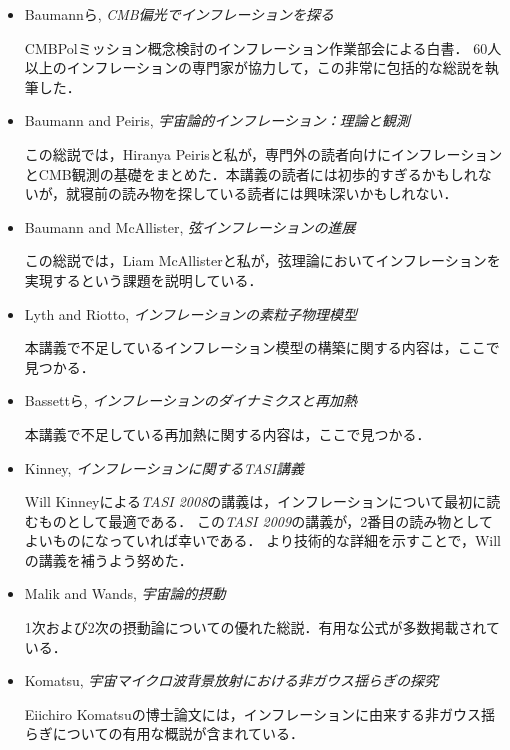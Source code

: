 \begin{itemize}
\item Baumannら, {\it CMB偏光でインフレーションを探る}

CMBPolミッション概念検討のインフレーション作業部会による白書．
60人以上のインフレーションの専門家が協力して，この非常に包括的な総説を執筆した．

\item Baumann and Peiris, {\it 宇宙論的インフレーション：理論と観測}

この総説では，Hiranya Peirisと私が，専門外の読者向けにインフレーションとCMB観測の基礎をまとめた．本講義の読者には初歩的すぎるかもしれないが，就寝前の読み物を探している読者には興味深いかもしれない．

\item Baumann and McAllister, {\it 弦インフレーションの進展}

この総説では，Liam McAllisterと私が，弦理論においてインフレーションを実現するという課題を説明している．

\item Lyth and Riotto, {\it インフレーションの素粒子物理模型}

本講義で不足しているインフレーション模型の構築に関する内容は，ここで見つかる．

\item Bassettら, {\it インフレーションのダイナミクスと再加熱}

本講義で不足している再加熱に関する内容は，ここで見つかる．

\item Kinney, {\it インフレーションに関するTASI講義}

Will Kinneyによる{\sl TASI 2008}の講義は，インフレーションについて最初に読むものとして最適である．
この{\sl TASI 2009}の講義が，2番目の読み物としてよいものになっていれば幸いである．
より技術的な詳細を示すことで，Willの講義を補うよう努めた．

\item Malik and Wands, {\it 宇宙論的摂動}

1次および2次の摂動論についての優れた総説．有用な公式が多数掲載されている．


\item Komatsu, {\it 宇宙マイクロ波背景放射における非ガウス揺らぎの探究}

Eiichiro Komatsuの博士論文には，インフレーションに由来する非ガウス揺らぎについての有用な概説が含まれている．
\end{itemize}



